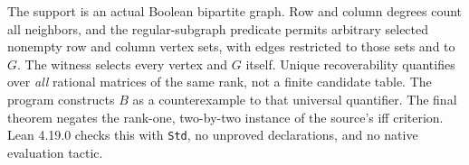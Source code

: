 \documentclass[11pt]{article}
\begin{document}
The support is an actual Boolean bipartite graph. Row and column degrees
count all neighbors, and the regular-subgraph predicate permits arbitrary
selected nonempty row and column vertex sets, with edges restricted to
those sets and to $G$. The witness selects every vertex and $G$ itself.
Unique recoverability quantifies over \emph{all} rational matrices of the
same rank, not a finite candidate table. The program constructs $B$ as a
counterexample to that universal quantifier. The final theorem negates the
rank-one, two-by-two instance of the source's iff criterion. Lean 4.19.0
checks this with \texttt{Std}, no unproved declarations, and no native
evaluation tactic.
\end{document}
